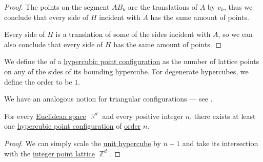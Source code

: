 \begin{proof}
  The points on the segment \( AB_k \) are the translations of \( A \) by \( v_k \), thus we conclude that every side of \( H \) incident with \( A \) has the same amount of points.

  Every side of \( H \) is a translation of some of the sides incident with \( A \), so we can also conclude that every side of \( H \) has the same amount of points.
\end{proof}

\begin{definition}\label{def:hypercubic_point_configuration_order}
  We define the  of a \hyperref[def:hypercubic_point_configuration]{hypercubic point configuration} as the number of lattice points on any of the sides of its bounding hypercube. For degenerate hypercubes, we define the order to be \( 1 \).
\end{definition}
\begin{comments}
  \item We have an analogous notion for triangular configurations --- see .
\end{comments}

\begin{proposition}\label{thm:hypercubic_point_configuration_existence}
  For every \hyperref[def:euclidean_space]{Euclidean space} \( \BbbR^d \) and every positive integer \( n \), there exists at least one \hyperref[def:hypercubic_point_configuration]{hypercubic point configuration} of \hyperref[def:hypercubic_point_configuration_order]{order} \( n \).
\end{proposition}
\begin{proof}
  We can simply scale the \hyperref[def:unit_hypercube]{unit hypercube} by \( n - 1 \) and take its intersection with the \hyperref[def:integer_point_lattice]{integer point lattice} \( \BbbZ^d \).
\end{proof}

